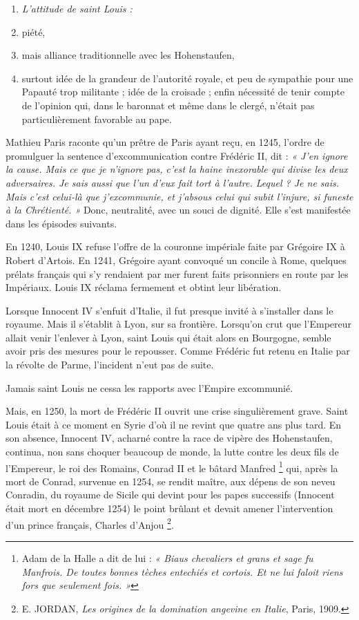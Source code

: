 \documentclass[french,twoside]{book} %
\newlength{\listmod}
\newcommand{\listhead}[1]{\hspace{-1\listmod}\emph{#1}}
\begin{document}
\begin{enumerate}[itemsep=0pt,]
\item[]\listhead{L’attitude de saint Louis :}
\item piété,
\item mais alliance traditionnelle avec les Hohenstaufen,
\item surtout idée de la grandeur de l’autorité royale, et peu de sympathie pour une Papauté trop militante ; idée de la croisade ; enfin nécessité de tenir compte de l’opinion qui, dans le baronnat et même dans le clergé, n’était pas particulièrement favorable au pape.

\end{enumerate}\noindent Mathieu Paris raconte qu’un prêtre de Paris ayant reçu, en 1245, l’ordre de promulguer la sentence d’excommunication contre Frédéric II, dit : \emph{« J’en ignore la cause. Mais ce que je n’ignore pas, c’est la haine inexorable qui divise les deux adversaires. Je sais aussi que l’un d’eux fait tort à l’autre. Lequel ? Je ne sais. Mais c’est celui-là que j’excommunie, et j’absous celui qui subit l’injure, si funeste à la Chrétienté. »} Donc, neutralité, avec un souci de dignité. Elle s’est manifestée dans les épisodes suivants.\par
En 1240, Louis IX refuse l’offre de la couronne impériale faite par Grégoire IX à Robert d’Artois. En 1241, Grégoire ayant convoqué un concile à Rome, quelques prélats français qui s’y rendaient par mer furent faits prisonniers en route par les Impériaux. Louis IX réclama fermement et obtint leur libération.\par
Lorsque Innocent IV s’enfuit d’Italie, il fut presque invité à s’installer dans le royaume. Mais il s’établit à Lyon, sur sa frontière. Lorsqu’on crut que l’Empereur allait venir l’enlever à Lyon, saint Louis qui était alors en Bourgogne, semble avoir pris des mesures pour le repousser. Comme Frédéric fut retenu en Italie par la révolte de Parme, l’incident n’eut pas de suite.\par
Jamais saint Louis ne cessa les rapports avec l’Empire excommunié.\par
Mais, en 1250, la mort de Frédéric II ouvrit une crise singulièrement grave. Saint Louis était à ce moment en Syrie d’où il ne revint que quatre ans plus tard. En son absence, Innocent IV, acharné contre la race de vipère des Hohenstaufen, continua, non sans choquer beaucoup de monde, la lutte contre les deux fils de  
\label{p31} l’Empereur, le roi des Romains, Conrad II et le bâtard Manfred \footnote{Adam de la Halle a dit de lui : \emph{« Biaus chevaliers et grans et sage fu Manfrois. De toutes bonnes tèches entechiés et cortois. Et ne lui faloit riens fors que seulement fois. »}} qui, après la mort de Conrad, survenue en 1254, se rendit maître, aux dépens de son neveu Conradin, du royaume de Sicile qui devint pour les papes successifs (Innocent était mort en décembre 1254) le point brûlant et devait amener l’intervention d’un prince français, Charles d’Anjou \footnote{ E. JORDAN, {\itshape Les origines de la domination angevine en Italie}, Paris, 1909.}.\par
\end{document}
